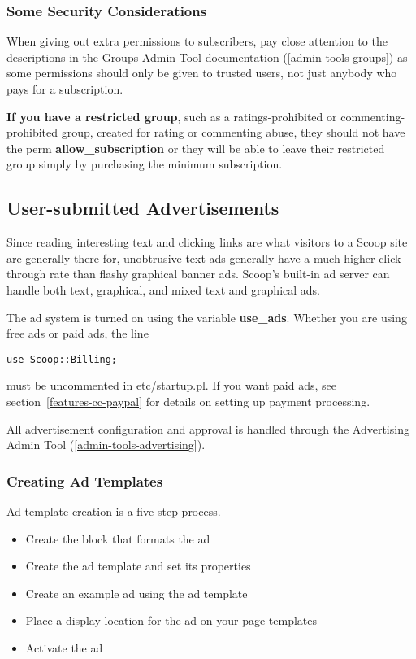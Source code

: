 \subsubsection{Some Security Considerations}
\label{subscription-security}

When giving out extra permissions to subscribers, pay close attention to the descriptions in the Groups Admin Tool documentation (\ref{admin-tools-groups}) as some permissions should only be given to trusted users, not just anybody who pays for a subscription.

{\bf If you have a restricted group}, such as a ratings-prohibited or commenting-prohibited group, created for rating or commenting abuse, they should not have the perm {\bf allow\_subscription} or they will be able to leave their restricted group simply by purchasing the minimum subscription.

\subsection{User-submitted Advertisements}
\label{features-textads}

Since reading interesting text and clicking links are what visitors to a Scoop site are generally there for, unobtrusive text ads generally have a much higher click-through rate than flashy graphical banner ads. Scoop's built-in ad server can handle both text, graphical, and mixed text and graphical ads.

The ad system is turned on using the variable {\bf use\_ads}. Whether you are using free ads or paid ads, the line
\begin{verbatim}
use Scoop::Billing;
\end{verbatim}
must be uncommented in etc/startup.pl. If you want paid ads, see section~\ref{features-cc-paypal} for details on setting up payment processing.

All advertisement configuration and approval is handled through the Advertising Admin Tool (\ref{admin-tools-advertising}).

\subsubsection{Creating Ad Templates}

Ad template creation is a five-step process.
\begin{itemize}
\item Create the block that formats the ad
\item Create the ad template and set its properties
\item Create an example ad using the ad template
\item Place a display location for the ad on your page templates
\item Activate the ad
\end{itemize}

